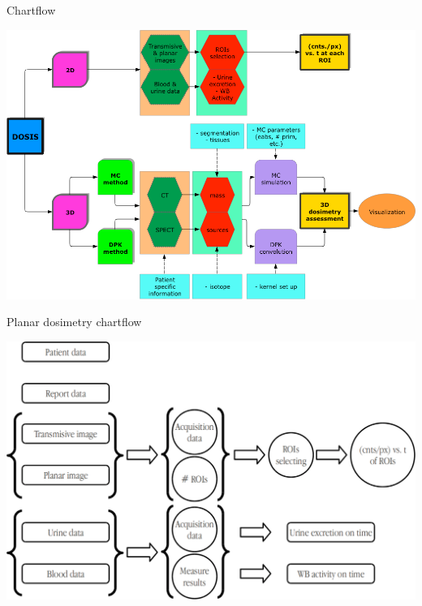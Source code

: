 \documentclass[ignorenonframetext,]{beamer}
\begin{document}
\begin{frame}{Chartflow}
\protect\hypertarget{chartflow}{}

\includegraphics{imgs/dosis-chartflow.png}

\end{frame}

\begin{frame}{Planar dosimetry chartflow}
\protect\hypertarget{planar-dosimetry-chartflow}{}

\includegraphics{imgs/planar-chartflow.png}

\end{frame}
\end{document}
